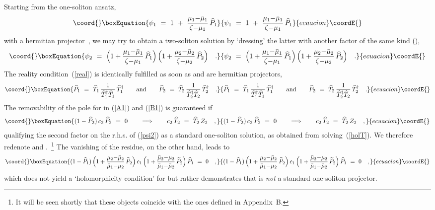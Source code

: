 \documentclass[a4paper,11pt]{article}
\numberwithin{equation}{section}
\providecommand{\Tt}{\widetilde{T}}
\providecommand{\Pt}{\widetilde{P}}
\providecommand{\Th}{\widehat{T}}
\providecommand{\Ph}{\widehat{P}}
\begin{document}
Starting from the one-soliton ansatz,
\begin{equation}\coord{}\boxEquation{
\psi_1\ =\ 1\ +\ \frac{\mu_1{-}\bar\mu_1}{\zeta{-}\mu_1}\,\Ph_1 
}{
\psi_1\ =\ 1\ +\ \frac{\mu_1{-}\bar\mu_1}{\zeta{-}\mu_1}\,\Ph_1 
}{ecuacion}\coordE{}\end{equation}
with a hermitian projector~\myHighlight{$\Ph_1$}\coordHE{},
we may try to obtain a two-soliton solution by `dressing' the latter with
another factor of the same kind (\coordHE{}),
\begin{equation}\coord{}\boxEquation{ \label{psi2}
\psi_2\ =\ \Bigl( 1+\frac{\mu_1{-}\bar\mu_1}{\zeta{-}\mu_1}\,\Ph_1 \Bigr)\,
           \Bigl( 1+\frac{\mu_2{-}\bar\mu_2}{\zeta{-}\mu_2}\,\Ph_2 \Bigr)\quad.
}{ \psi_2\ =\ \Bigl( 1+\frac{\mu_1{-}\bar\mu_1}{\zeta{-}\mu_1}\,\Ph_1 \Bigr)\,
           \Bigl( 1+\frac{\mu_2{-}\bar\mu_2}{\zeta{-}\mu_2}\,\Ph_2 \Bigr)\quad.
}{ecuacion}\coordE{}\end{equation}
The reality condition~(\ref{real}) is identically fulfilled as soon as
\myHighlight{$\Ph_1$}\coordHE{} and \myHighlight{$\Ph_2$}\coordHE{} are hermitian projectors,
\begin{equation}\coord{}\boxEquation{
\Ph_1\ =\ \Th_1\,\frac{1}{\Th_1^\dagger\Th_1}\,\Th_1^\dagger
\qquad\textrm{and}\qquad
\Ph_2\ =\ \Th_2\,\frac{1}{\Th_2^\dagger\Th_2}\,\Th_2^\dagger \quad.
}{
\Ph_1\ =\ \Th_1\,\frac{1}{\Th_1^\dagger\Th_1}\,\Th_1^\dagger
\qquad\textrm{and}\qquad
\Ph_2\ =\ \Th_2\,\frac{1}{\Th_2^\dagger\Th_2}\,\Th_2^\dagger \quad.
}{ecuacion}\coordE{}\end{equation}
The removability of the pole for \coordHE{} in (\ref{A1}) and
(\ref{B1}) is guaranteed if
\begin{equation}\coord{}\boxEquation{ \label{hatequation}
(1-\Ph_2)\,c_2\,\Ph_2\ =\ 0
\qquad\Longrightarrow\qquad
c_2\,\Th_2\ =\ \Th_2\,Z_2 \quad,
}{ (1-\Ph_2)\,c_2\,\Ph_2\ =\ 0
\qquad\Longrightarrow\qquad
c_2\,\Th_2\ =\ \Th_2\,Z_2 \quad,
}{ecuacion}\coordE{}\end{equation}
qualifying the second factor on the r.h.s. of (\ref{psi2}) 
as a standard one-soliton solution, as obtained from solving~(\ref{holT}).
We therefore redenote \myHighlight{$\Ph_2\to\Pt_2$}\coordHE{} and \myHighlight{$\Th_2\to\Tt_2$}\coordHE{}.~\footnote{
It will be seen shortly that these objects coincide with the ones defined
in Appendix~B.}
The vanishing of the \coordHE{} residue, on the other hand, leads to
\begin{equation}\coord{}\boxEquation{ \label{Ph1equation}
(1-\Ph_1)\,\Bigl(1+\frac{\mu_2{-}\bar\mu_2}{\bar\mu_1{-}\mu_2}\,\Pt_2\Bigr)\,
c_1\,\Bigl(1+\frac{\bar\mu_2{-}\mu_2}{\bar\mu_1{-}\bar\mu_2}\,\Pt_2\Bigr)\,\Ph_1
\ =\ 0 \quad,
}{ (1-\Ph_1)\,\Bigl(1+\frac{\mu_2{-}\bar\mu_2}{\bar\mu_1{-}\mu_2}\,\Pt_2\Bigr)\,
c_1\,\Bigl(1+\frac{\bar\mu_2{-}\mu_2}{\bar\mu_1{-}\bar\mu_2}\,\Pt_2\Bigr)\,\Ph_1
\ =\ 0 \quad,
}{ecuacion}\coordE{}\end{equation}
which does not yield a `holomorphicity condition' for \myHighlight{$\Th_1$}\coordHE{} but rather 
demonstrates that \myHighlight{$\Ph_1$}\coordHE{} is {\it not\/} a standard one-soliton projector.
\end{document}
